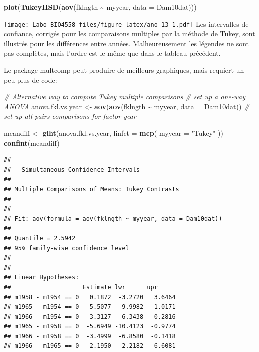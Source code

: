 \documentclass[
  12pt,
]{book}
\newenvironment{Shaded}{\begin{snugshade}}{\end{snugshade}}
\newcommand{\CommentTok}[1]{\textcolor[rgb]{0.56,0.35,0.01}{\textit{#1}}}
\newcommand{\DataTypeTok}[1]{\textcolor[rgb]{0.13,0.29,0.53}{#1}}
\newcommand{\KeywordTok}[1]{\textcolor[rgb]{0.13,0.29,0.53}{\textbf{#1}}}
\newcommand{\NormalTok}[1]{#1}
\newcommand{\OperatorTok}[1]{\textcolor[rgb]{0.81,0.36,0.00}{\textbf{#1}}}
\newcommand{\StringTok}[1]{\textcolor[rgb]{0.31,0.60,0.02}{#1}}
\begin{document}
\begin{Shaded}
\begin{Highlighting}[]
\KeywordTok{plot}\NormalTok{(}\KeywordTok{TukeyHSD}\NormalTok{(}\KeywordTok{aov}\NormalTok{(fklngth }\OperatorTok{\textasciitilde{}}\StringTok{ }\NormalTok{myyear, }\DataTypeTok{data =}\NormalTok{ Dam10dat)))}
\end{Highlighting}
\end{Shaded}

\texttt{[image: Labo\_BIO4558\_files/figure-latex/ano-13-1.pdf]}
Les intervalles de confiance, corrigés pour les comparaisons multiples par la méthode de Tukey, sont illustrés pour les différences entre années. Malheureusement les légendes ne sont pas complètes, mais l'ordre est le même que dans le tableau précédent.

Le package multcomp peut produire de meilleurs graphiques, mais requiert un peu plus de code:

\begin{Shaded}
\begin{Highlighting}[]
\CommentTok{\# Alternative way to compute Tukey multiple comparisons}
\CommentTok{\# set up a one{-}way ANOVA}
\NormalTok{anova.fkl.vs.year \textless{}{-}}\StringTok{ }\KeywordTok{aov}\NormalTok{(}\KeywordTok{aov}\NormalTok{(fklngth }\OperatorTok{\textasciitilde{}}\StringTok{ }\NormalTok{myyear, }\DataTypeTok{data =}\NormalTok{ Dam10dat))}
\CommentTok{\# set up all{-}pairs comparisons for factor \textasciigrave{}year\textquotesingle{}}

\NormalTok{meandiff \textless{}{-}}\StringTok{ }\KeywordTok{glht}\NormalTok{(anova.fkl.vs.year, }\DataTypeTok{linfct =} \KeywordTok{mcp}\NormalTok{(}
  \DataTypeTok{myyear =}
    \StringTok{"Tukey"}
\NormalTok{))}
\KeywordTok{confint}\NormalTok{(meandiff)}
\end{Highlighting}
\end{Shaded}

\begin{verbatim}
## 
##   Simultaneous Confidence Intervals
## 
## Multiple Comparisons of Means: Tukey Contrasts
## 
## 
## Fit: aov(formula = aov(fklngth ~ myyear, data = Dam10dat))
## 
## Quantile = 2.5942
## 95% family-wise confidence level
##  
## 
## Linear Hypotheses:
##                    Estimate lwr      upr     
## m1958 - m1954 == 0   0.1872  -3.2720   3.6464
## m1965 - m1954 == 0  -5.5077  -9.9982  -1.0171
## m1966 - m1954 == 0  -3.3127  -6.3438  -0.2816
## m1965 - m1958 == 0  -5.6949 -10.4123  -0.9774
## m1966 - m1958 == 0  -3.4999  -6.8580  -0.1418
## m1966 - m1965 == 0   2.1950  -2.2182   6.6081
\end{verbatim}
\end{document}
